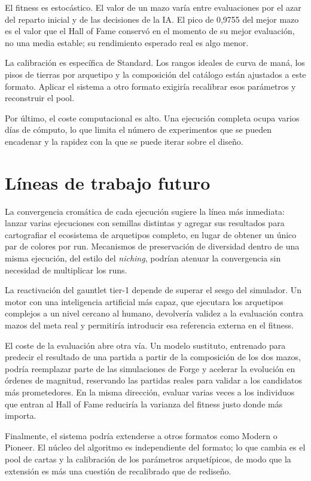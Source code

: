 El fitness es estocástico. El valor de un mazo varía entre evaluaciones por el azar del reparto inicial y de las decisiones de la IA. El pico de 0,9755 del mejor mazo es el valor que el Hall of Fame conservó en el momento de su mejor evaluación, no una media estable; su rendimiento esperado real es algo menor.

La calibración es específica de Standard. Los rangos ideales de curva de maná, los pisos de tierras por arquetipo y la composición del catálogo están ajustados a este formato. Aplicar el sistema a otro formato exigiría recalibrar esos parámetros y reconstruir el pool.

Por último, el coste computacional es alto. Una ejecución completa ocupa varios días de cómputo, lo que limita el número de experimentos que se pueden encadenar y la rapidez con la que se puede iterar sobre el diseño.

\section{Líneas de trabajo futuro}

La convergencia cromática de cada ejecución sugiere la línea más inmediata: lanzar varias ejecuciones con semillas distintas y agregar sus resultados para cartografiar el ecosistema de arquetipos completo, en lugar de obtener un único par de colores por run. Mecanismos de preservación de diversidad dentro de una misma ejecución, del estilo del \emph{niching}, podrían atenuar la convergencia sin necesidad de multiplicar los runs.

La reactivación del gauntlet tier-1 depende de superar el sesgo del simulador. Un motor con una inteligencia artificial más capaz, que ejecutara los arquetipos complejos a un nivel cercano al humano, devolvería validez a la evaluación contra mazos del meta real y permitiría introducir esa referencia externa en el fitness.

El coste de la evaluación abre otra vía. Un modelo sustituto, entrenado para predecir el resultado de una partida a partir de la composición de los dos mazos, podría reemplazar parte de las simulaciones de Forge y acelerar la evolución en órdenes de magnitud, reservando las partidas reales para validar a los candidatos más prometedores. En la misma dirección, evaluar varias veces a los individuos que entran al Hall of Fame reduciría la varianza del fitness justo donde más importa.

Finalmente, el sistema podría extenderse a otros formatos como Modern o Pioneer. El núcleo del algoritmo es independiente del formato; lo que cambia es el pool de cartas y la calibración de los parámetros arquetípicos, de modo que la extensión es más una cuestión de recalibrado que de rediseño.
